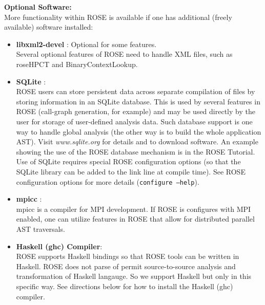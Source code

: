 {\bf Optional Software:} \\
More functionality within ROSE is available if one has additional (freely available) software installed:
\begin{itemize}
   \item {\bf libxml2-devel }: Optional for some features. \\
         Several optional features of ROSE need to handle XML files, such as
         roseHPCT and BinaryContextLookup.


 \item {\bf SQLite} : \\
          ROSE users can store persistent data across separate compilation of files by
          storing information in an SQLite database.  This is used by several features
          in ROSE (call-graph generation, for example) and may be used directly by the
          user for storage of user-defined analysis data.  Such database support is
          one way to handle global analysis (the other way is to build the whole
          application AST). Visit {\it www.sqlite.org} for details and to download
          software. %
          An example showing the use of the ROSE database mechanism is in the ROSE
          Tutorial. Use of SQLite requires special ROSE configuration options (so that
          the SQLite library can be added to the link line at compile time).  See ROSE
          configuration options for more details ({\tt configure --help}).
   \item {\bf mpicc} : \\
          mpicc is a compiler for MPI development. If ROSE is configures with MPI
          enabled, one can utilize features in ROSE that allow for distributed
          parallel AST traversals.
   \item {\bf Haskell (ghc) Compiler}: \\
          ROSE supports Haskell bindings so that ROSE tools can be written in Haskell.
          ROSE does not parse of permit source-to-source analysis and transformation of
          Haskell langauge.  So we support Haskell but only in this specific way.
          See directions below for how to install the Haskell (ghc) compiler.

\end{itemize}



